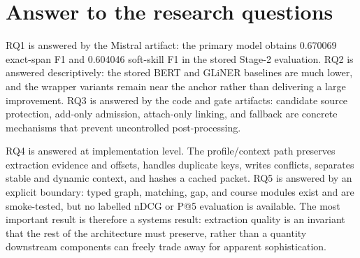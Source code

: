 \section{Answer to the research questions}

RQ1 is answered by the Mistral artifact: the primary model obtains 0.670069 exact-span F1 and 0.604046 soft-skill F1 in the stored Stage-2 evaluation. RQ2 is answered descriptively: the stored BERT and GLiNER baselines are much lower, and the wrapper variants remain near the anchor rather than delivering a large improvement. RQ3 is answered by the code and gate artifacts: candidate source protection, add-only admission, attach-only linking, and fallback are concrete mechanisms that prevent uncontrolled post-processing.

RQ4 is answered at implementation level. The profile/context path preserves extraction evidence and offsets, handles duplicate keys, writes conflicts, separates stable and dynamic context, and hashes a cached packet. RQ5 is answered by an explicit boundary: typed graph, matching, gap, and course modules exist and are smoke-tested, but no labelled nDCG or P@5 evaluation is available. The most important result is therefore a systems result: extraction quality is an invariant that the rest of the architecture must preserve, rather than a quantity downstream components can freely trade away for apparent sophistication.
